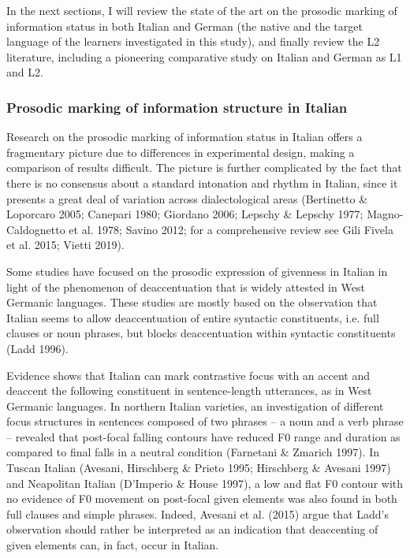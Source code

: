 \begin{styleStandard}
In the next sections, I will review the state of the art on the prosodic marking of information status in both Italian and German (the native and the target language of the learners investigated in this study), and finally review the L2 literature, including a pioneering comparative study on Italian and German as L1 and L2.
\end{styleStandard}

\subsubsection{Prosodic marking of information structure in Italian}
\hypertarget{Toc191305887}{}\begin{styleStandard}
Research on the prosodic marking of information status in Italian offers a fragmentary picture due to differences in experimental design, making a comparison of results difficult. The picture is further complicated by the fact that there is no consensus about a standard intonation and rhythm in Italian, since it presents a great deal of variation across dialectological areas (Bertinetto \& Loporcaro 2005; Canepari 1980; Giordano 2006; Lepschy \& Lepschy 1977; Magno-Caldognetto et al. 1978; Savino 2012; for a comprehensive review see Gili Fivela et al. 2015; Vietti 2019). 
\end{styleStandard}

\begin{styleStandard}
Some studies have focused on the prosodic expression of givenness in Italian in light of the phenomenon of deaccentuation that is widely attested in West Germanic languages. These studies are mostly based on the observation that Italian seems to allow deaccentuation of entire syntactic constituents, i.e. full clauses or noun phrases, but blocks deaccentuation within syntactic constituents (Ladd 1996).
\end{styleStandard}

\begin{styleStandard}
Evidence shows that Italian can mark contrastive focus with an accent and deaccent the following constituent in sentence-length utterances, as in West Germanic languages. In northern Italian varieties, an investigation of different focus structures in sentences composed of two phrases – a noun and a verb phrase – revealed that post-focal falling contours have reduced F0 range and duration as compared to final falls in a neutral condition (Farnetani \& Zmarich 1997). In Tuscan Italian (Avesani, Hirschberg \& Prieto 1995; Hirschberg \& Avesani 1997) and Neapolitan Italian (D’Imperio \& House 1997), a low and flat F0 contour with no evidence of F0 movement on post-focal given elements was also found in both full clauses and simple phrases. Indeed, Avesani et al. (2015) argue that Ladd’s observation should rather be interpreted as an indication that deaccenting of given elements can, in fact, occur in Italian. 
\end{styleStandard}

